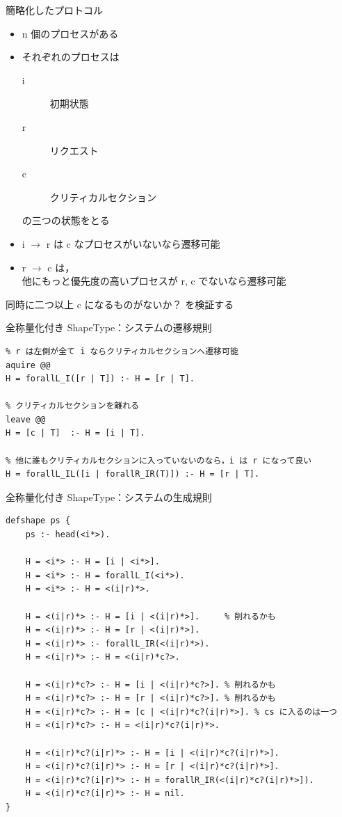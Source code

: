 \documentclass[presentation, xetex]{beamer}
\begin{document}
\begin{frame}[label={sec:orge01eb95}]{簡略化したプロトコル}
\begin{itemize}
\item n 個のプロセスがある
\item それぞれのプロセスは
\begin{description}
\item[{i}] 初期状態
\item[{r}] リクエスト
\item[{c}] クリティカルセクション
\end{description}
の三つの状態をとる
\item i \(\longrightarrow\) r は c なプロセスがいないなら遷移可能
\item r \(\longrightarrow\) c は，\\
他にもっと優先度の高いプロセスが r, c でないなら遷移可能
\end{itemize}


同時に二つ以上 c になるものがないか？
を検証する
\end{frame}



\begin{frame}[label={sec:orgf5075e6},fragile]{全称量化付き ShapeType：システムの遷移規則}
 \footnotesize
\begin{verbatim}
% r は左側が全て i ならクリティカルセクションへ遷移可能
aquire @@
H = forallL_I([r | T]) :- H = [r | T].

% クリティカルセクションを離れる
leave @@
H = [c | T]  :- H = [i | T].

% 他に誰もクリティカルセクションに入っていないのなら，i は r になって良い
H = forallL_IL([i | forallR_IR(T)]) :- H = [r | T].
\end{verbatim}
\end{frame}




\begin{frame}[label={sec:orgfb89d01},fragile]{全称量化付き ShapeType：システムの生成規則}
 \tiny
\begin{verbatim}
defshape ps {
    ps :- head(<i*>).

    H = <i*> :- H = [i | <i*>].
    H = <i*> :- H = forallL_I(<i*>).
    H = <i*> :- H = <(i|r)*>.

    H = <(i|r)*> :- H = [i | <(i|r)*>].     % 削れるかも
    H = <(i|r)*> :- H = [r | <(i|r)*>].
    H = <(i|r)*> :- forallL_IR(<(i|r)*>).
    H = <(i|r)*> :- H = <(i|r)*c?>.

    H = <(i|r)*c?> :- H = [i | <(i|r)*c?>]. % 削れるかも
    H = <(i|r)*c?> :- H = [r | <(i|r)*c?>]. % 削れるかも
    H = <(i|r)*c?> :- H = [c | <(i|r)*c?(i|r)*>]. % cs に入るのは一つ
    H = <(i|r)*c?> :- H = <(i|r)*c?(i|r)*>.

    H = <(i|r)*c?(i|r)*> :- H = [i | <(i|r)*c?(i|r)*>].
    H = <(i|r)*c?(i|r)*> :- H = [r | <(i|r)*c?(i|r)*>].
    H = <(i|r)*c?(i|r)*> :- H = forallR_IR(<(i|r)*c?(i|r)*>]).
    H = <(i|r)*c?(i|r)*> :- H = nil.
}
\end{verbatim}
\end{frame}
\end{document}
